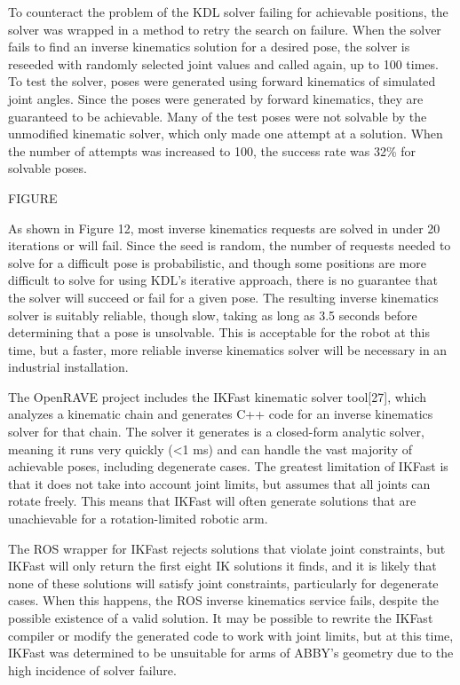\documentclass[]{cwru} %
\begin{document}
To counteract the problem of the KDL solver failing for achievable
positions, the solver was wrapped in a method to retry the search on
failure. When the solver fails to find an inverse kinematics solution
for a desired pose, the solver is reseeded with randomly selected joint
values and called again, up to 100 times. To test the solver, poses were
generated using forward kinematics of simulated joint angles. Since the
poses were generated by forward kinematics, they are guaranteed to be
achievable. Many of the test poses were not solvable by the unmodified
kinematic solver, which only made one attempt at a solution. When the
number of attempts was increased to 100, the success rate was 32\% for
solvable poses.

FIGURE

As shown in Figure 12, most inverse kinematics requests are solved in
under 20 iterations or will fail. Since the seed is random, the number
of requests needed to solve for a difficult pose is probabilistic, and
though some positions are more difficult to solve for using KDL's
iterative approach, there is no guarantee that the solver will succeed
or fail for a given pose. The resulting inverse kinematics solver is
suitably reliable, though slow, taking as long as 3.5 seconds before
determining that a pose is unsolvable. This is acceptable for the robot
at this time, but a faster, more reliable inverse kinematics solver will
be necessary in an industrial installation.

The OpenRAVE project includes the IKFast kinematic solver tool{[}27{]},
which analyzes a kinematic chain and generates C++ code for an inverse
kinematics solver for that chain. The solver it generates is a
closed-form analytic solver, meaning it runs very quickly (\textless{}1
ms) and can handle the vast majority of achievable poses, including
degenerate cases. The greatest limitation of IKFast is that it does not
take into account joint limits, but assumes that all joints can rotate
freely. This means that IKFast will often generate solutions that are
unachievable for a rotation-limited robotic arm.

The ROS wrapper for IKFast rejects solutions that violate joint
constraints, but IKFast will only return the first eight IK solutions it
finds, and it is likely that none of these solutions will satisfy joint
constraints, particularly for degenerate cases. When this happens, the
ROS inverse kinematics service fails, despite the possible existence of
a valid solution. It may be possible to rewrite the IKFast compiler or
modify the generated code to work with joint limits, but at this time,
IKFast was determined to be unsuitable for arms of ABBY's geometry due
to the high incidence of solver failure.
\end{document}
